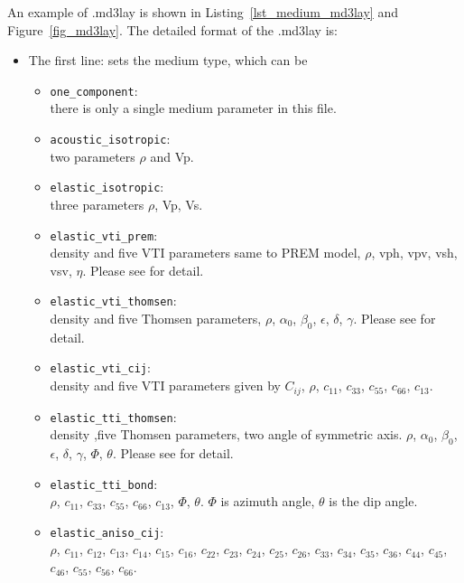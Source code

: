 An example of .md3lay is shown in Listing~\ref{lst_medium_md3lay} and Figure~\ref{fig_md3lay}.
The detailed format of the .md3lay is:
\begin{itemize}
  \item The first line: sets the medium type, which can be
    \begin{itemize}
    \item \verb|one_component|: \\
      there is only a single medium parameter in this file.
    \item \verb|acoustic_isotropic|: \\
      two parameters $\rho$ and Vp.
    \item \verb|elastic_isotropic|: \\
      three parameters $\rho$, Vp, Vs.
    \item \verb|elastic_vti_prem|: \\
      density and five VTI parameters same to PREM model,
       $\rho$, vph, vpv, vsh, vsv, $\eta$. Please see \citep{dziewonski1981preliminary} for detail.
    \item \verb|elastic_vti_thomsen|: \\
      density and five Thomsen parameters,
        $\rho$, $\alpha_0$, $\beta_0$, $\epsilon$, $\delta$, $\gamma$.
        Please see \citep{ thomsen1986weak} for detail.
    \item \verb|elastic_vti_cij|: \\
      density and five VTI parameters given by $C_{ij}$,
         $\rho$, $c_{11}$, $c_{33}$, $c_{55}$, $c_{66}$, $c_{13}$. 
    \item \verb|elastic_tti_thomsen|: \\
      density ,five Thomsen parameters, two angle of symmetric axis.
         $\rho$, $\alpha_0$, $\beta_0$, $\epsilon$, $\delta$, $\gamma$, $\Phi$, $\theta$.
         Please see \citep{thomsen1986weak} for detail.
    \item \verb|elastic_tti_bond|: \\
          $\rho$, $c_{11}$, $c_{33}$, $c_{55}$, $c_{66}$, $c_{13}$, $\Phi$, $\theta$.
          $\Phi$ is azimuth angle, $\theta$ is the dip angle.
    \item \verb|elastic_aniso_cij|: \\
           $\rho$, $c_{11}$, $c_{12}$, $c_{13}$, $c_{14}$, $c_{15}$, $c_{16}$,  
                                      $c_{22}$, $c_{23}$, $c_{24}$, $c_{25}$, $c_{26}$, 
                                      $c_{33}$, $c_{34}$, $c_{35}$, $c_{36}$, $c_{44}$,
                                      $c_{45}$, $c_{46}$, $c_{55}$, $c_{56}$, $c_{66}$.


\end{itemize}
\end{itemize}
